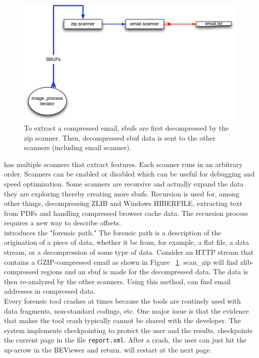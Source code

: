 \documentclass[11pt,fleqn]{article} %
\begin{document}
\begin{figure}
	\includegraphics[scale=0.60]{extractinformationreprocess.pdf}
	\caption{To extract a compressed email, sbufs are first decompressed by the zip scanner. Then, decompressed sbuf data is sent to the other scanners (including email scanner). }
	\label{fig:extractinformationreprocess}
\end{figure}

\bulk has multiple scanners that extract features. Each scanner runs in an arbitrary order. Scanners can be enabled or disabled which can be useful for debugging and speed optimization. Some scanners are recursive and actually expand the data they are exploring thereby creating more sbufs. Recursion is used for, among other things, decompressing ZLIB and Windows HIBERFILE, extracting text from PDFs and handling compressed browser cache data. The recursion process requires a new way to describe offsets.\\

\bulk introduces the "forensic path." The forensic path is a description of the origination of a piece of data, whether it be from, for example, a flat file, a data stream, or a decompression of some type of data. Consider an HTTP stream that contains a GZIP-compressed email as shown in Figure ~\ref{fig:extractinformationreprocess}. scan\_zip will find zlib-compressed regions and an sbuf is made for the decompressed data. The data is then re-analyzed by the other scanners. Using this method, \bulk can find email addresses in compressed data.\\

Every forensic tool crashes at times because the tools are routinely used with data fragments, non-standard codings, etc. One major issue is that the evidence that makes the tool crash typically cannot be shared with the developer. The \bulk system implements checkpointing to protect the user and the results. \bulk checkpoints the current page in the file \texttt{report.xml}. After a crash, the user can just hit the up-arrow in the BEViewer and return. \bulk will restart at the next page. \\
\end{document}
